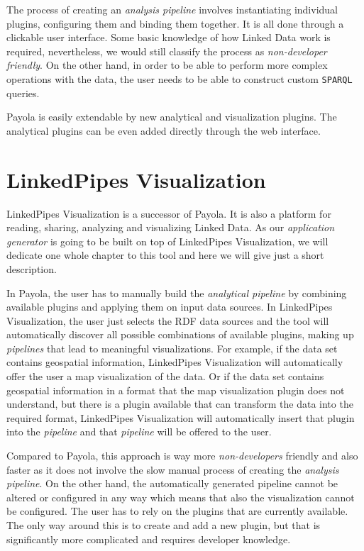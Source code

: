 The process of creating an \emph{analysis pipeline} involves instantiating individual plugins, configuring them and binding them together. It is all done through a clickable user interface. Some basic knowledge of how Linked Data work is required, nevertheless, we would still classify the process as \emph{non-developer friendly}. On the other hand, in order to be able to perform more complex operations with the data, the user needs to be able to construct custom \texttt{SPARQL} queries.

Payola is easily extendable by new analytical and visualization plugins. The analytical plugins can be even added directly through the web interface.

\section{LinkedPipes Visualization}

LinkedPipes Visualization \cite{linked_pipes_visualization} is a successor of Payola. It is also a platform for reading, sharing, analyzing and visualizing Linked Data. As our \emph{application generator} is going to be built on top of LinkedPipes Visualization, we will dedicate one whole chapter to this tool and here we will give just a short description.

In Payola, the user has to manually build the \emph{analytical pipeline} by combining available plugins and applying them on input data sources. In LinkedPipes Visualization, the user just selects the RDF data sources and the tool will automatically discover all possible combinations of available plugins, making up \emph{pipelines} that lead to meaningful visualizations. For example, if the data set contains geospatial information, LinkedPipes Visualization will automatically offer the user a map visualization of the data. Or if the data set contains geospatial information in a format that the map visualization plugin does not understand, but there is a plugin available that can transform the data into the required format, LinkedPipes Visualization will automatically insert that plugin into the \emph{pipeline} and that \emph{pipeline} will be offered to the user.

Compared to Payola, this approach is way more \emph{non-developers} friendly and also faster as it does not involve the slow manual process of creating the \emph{analysis pipeline}. On the other hand,  the automatically generated pipeline cannot be altered or configured in any way which means that also the visualization cannot be configured. The user has to rely on the plugins that are currently available. The only way around this is to create and add a new plugin, but that is significantly more complicated and requires developer knowledge.